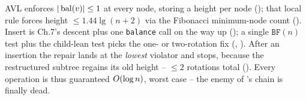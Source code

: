 \begin{recallbox}
AVL enforces $|\operatorname{bal}(v)|\le1$ at every node, storing a height per node (); that local rule
forces height $\le 1.44\lg(n+2)$ via the Fibonacci minimum-node count (). Insert is
Ch.7's descent plus one \texttt{balance} call on the way up (); a single $\texttt{BF}(n)$
test plus the child-lean test picks the one- or two-rotation fix (,
). After an insertion the repair lands at the \emph{lowest} violator and stops, because
the restructured subtree regains its old height -- $\le2$ rotations total (). Every
operation is thus guaranteed $O(\log n)$, worst case -- the enemy of 's chain is
finally dead.
\end{recallbox}
